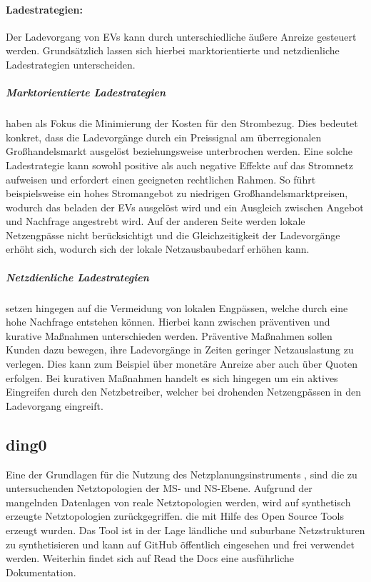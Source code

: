 


\paragraph{Ladestrategien:}

Der Ladevorgang von \glspl{EV} kann durch unterschiedliche äußere Anreize gesteuert werden. Grundsätzlich lassen sich hierbei marktorientierte und netzdienliche Ladestrategien unterscheiden.


\subparagraph{Marktorientierte Ladestrategien} haben als Fokus die Minimierung der Kosten für den Strombezug. Dies bedeutet konkret, dass die Ladevorgänge durch ein Preissignal am überregionalen Großhandelsmarkt ausgelöst beziehungsweise unterbrochen werden. Eine solche Ladestrategie kann sowohl positive als auch negative Effekte auf das Stromnetz aufweisen und erfordert einen geeigneten rechtlichen Rahmen. So führt beispielsweise ein hohes Stromangebot zu niedrigen Großhandelsmarktpreisen, wodurch das beladen der \glspl{EV} ausgelöst wird und ein Ausgleich zwischen Angebot und Nachfrage angestrebt wird. Auf der anderen Seite werden lokale Netzengpässe nicht berücksichtigt und die Gleichzeitigkeit der Ladevorgänge erhöht sich, wodurch sich der lokale Netzausbaubedarf erhöhen kann. \cite{Agora2019} \cite{Dorendorf2019} \cite{Rehtanz2017}


\subparagraph{Netzdienliche Ladestrategien} setzen hingegen auf die Vermeidung von lokalen Engpässen, welche durch eine hohe Nachfrage entstehen können. Hierbei kann zwischen präventiven und kurative Maßnahmen unterschieden werden. Präventive Maßnahmen sollen Kunden dazu bewegen, ihre Ladevorgänge in Zeiten geringer Netzauslastung zu verlegen. Dies kann zum Beispiel über monetäre Anreize aber auch über Quoten erfolgen. Bei kurativen Maßnahmen handelt es sich hingegen um ein aktives Eingreifen durch den Netzbetreiber, welcher bei drohenden Netzengpässen in den Ladevorgang eingreift. \cite{Agora2019}


\subsection{ding0}\label{chap:dingo_theo}

Eine der Grundlagen für die Nutzung des Netzplanungsinstruments \edisgodot, sind die zu untersuchenden Netztopologien der \gls{MS}- und \gls{NS}-Ebene.
Aufgrund der mangelnden Datenlagen von reale Netztopologien werden, wird auf synthetisch erzeugte Netztopologien zurückgegriffen.
die mit Hilfe des Open Source Tools \dingo erzeugt wurden.
Das Tool ist in der Lage ländliche und suburbane Netzstrukturen zu synthetisieren und kann auf GitHub \cite{dingo2019} öffentlich eingesehen und frei verwendet werden.
Weiterhin findet sich auf Read the Docs \cite{dingo-docs2019} eine ausführliche Dokumentation.\medskip


